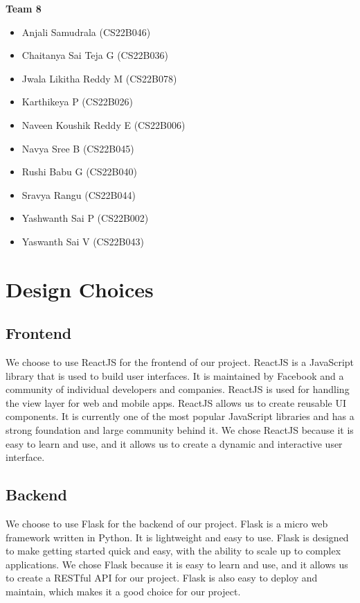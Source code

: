 \documentclass[12pt]{article}
\begin{document}
\begin{center}
    \noindent \textbf{Team 8}
    \begin{multicols}{2}
        \begin{itemize}
            \item Anjali Samudrala (CS22B046)
            \item Chaitanya Sai Teja G (CS22B036)
            \item Jwala Likitha Reddy M (CS22B078)
            \item Karthikeya P (CS22B026)
            \item Naveen Koushik Reddy E (CS22B006)
            \item Navya Sree B (CS22B045)
            \item Rushi Babu G (CS22B040)
            \item Sravya Rangu (CS22B044)
            \item Yashwanth Sai P (CS22B002)
            \item Yaswanth Sai V (CS22B043)
        \end{itemize}
    \end{multicols}
    \vspace{0.5cm}

\end{center}
\clearpage
\tableofcontents
\clearpage
\listoffigures
\clearpage

\section{Design Choices}
\subsection{Frontend}
We choose to use ReactJS for the frontend of our project. ReactJS is a JavaScript library that is used to build user interfaces. It is maintained by Facebook and a community of individual developers and companies. ReactJS is used for handling the view layer for web and mobile apps. ReactJS allows us to create reusable UI components. It is currently one of the most popular JavaScript libraries and has a strong foundation and large community behind it. We chose ReactJS because it is easy to learn and use, and it allows us to create a dynamic and interactive user interface.

\subsection{Backend}
We choose to use Flask for the backend of our project. Flask is a micro web framework written in Python. It is lightweight and easy to use. Flask is designed to make getting started quick and easy, with the ability to scale up to complex applications. We chose Flask because it is easy to learn and use, and it allows us to create a RESTful API for our project. Flask is also easy to deploy and maintain, which makes it a good choice for our project.
\end{document}
